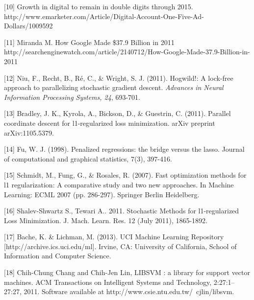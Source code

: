 \documentclass{article} %
\begin{document}
{[10] Growth in digital to remain in double digits through 2015. http://www.emarketer.com/Article/Digital-Account-One-Five-Ad-Dollars/1009592

[11] Miranda M. How Google Made \$37.9 Billion in 2011 http://searchenginewatch.com/article/2140712/How-Google-Made-37.9-Billion-in-2011

[12] Niu, F., Recht, B., Ré, C., \& Wright, S. J. (2011). Hogwild!: A lock-free approach to parallelizing stochastic gradient descent. {\it Advances in Neural Information Processing Systems, 24}, 693-701.

[13] Bradley, J. K., Kyrola, A., Bickson, D., \& Guestrin, C. (2011). Parallel coordinate descent for l1-regularized loss minimization. arXiv preprint arXiv:1105.5379.

[14] Fu, W. J. (1998). Penalized regressions: the bridge versus the lasso. Journal of computational and graphical statistics, 7(3), 397-416.

[15] Schmidt, M., Fung, G., \& Rosales, R. (2007). Fast optimization methods for l1 regularization: A comparative study and two new approaches. In Machine Learning: ECML 2007 (pp. 286-297). Springer Berlin Heidelberg.

[16] Shalev-Shwartz S., Tewari A.. 2011. Stochastic Methods for l1-regularized Loss Minimization. J. Mach. Learn. Res. 12 (July 2011), 1865-1892.

[17] Bache, K. \& Lichman, M. (2013). UCI Machine Learning Repository [http://archive.ics.uci.edu/ml]. Irvine, CA: University of California, School of Information and Computer Science.

[18] Chih-Chung Chang and Chih-Jen Lin, LIBSVM : a library for support vector machines. ACM Transactions on Intelligent Systems and Technology, 2:27:1--27:27, 2011. Software available at http://www.csie.ntu.edu.tw/~cjlin/libsvm. 
}
\end{document}
